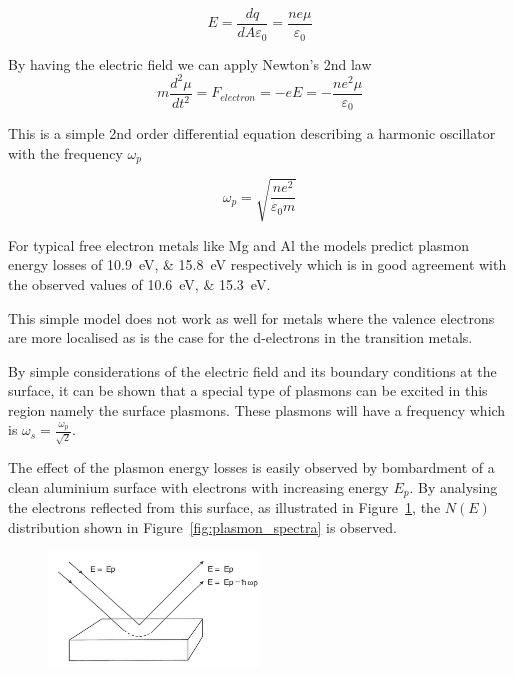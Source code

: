 \begin{equation}
E = \frac{dq}{dA\varepsilon_{0}}=\frac{ne\mu}{\varepsilon_{0}}
\end{equation}


By having the electric field we can apply Newton's 2nd law
\begin{equation}
m\frac{d^{2}\mu}{dt^2}= F_{electron}=-eE=-\frac{ne^2\mu}{\varepsilon_0}
\end{equation}

This is a simple 2nd order differential equation describing a harmonic oscillator with the frequency $\omega_{p}$

\begin{equation}
\omega_p = \sqrt{\frac{ne^2}{\varepsilon_0 m}}
\end{equation}

For typical free electron metals like Mg and Al the models predict plasmon energy losses of \SIlist{10.9;15.8}{\electronvolt} respectively which is in good agreement with the observed values of \SIlist{10.6;15.3}{\electronvolt}.

This simple model does not work as well for metals where the valence electrons are more localised as is the case for the d-electrons in the transition metals.

By simple considerations of the electric field and its boundary conditions at the surface, it can be shown that a special type of plasmons can be excited in this region namely the surface plasmons. These plasmons will have a frequency which is $\omega_{s} = \frac{\omega_{p}}{\sqrt{2}}$.

The effect of the plasmon energy losses is easily observed by bombardment of a clean aluminium surface with electrons with increasing energy $E_{p}$. By analysing the electrons reflected from this surface, as illustrated in Figure~\ref{fig:plasmon_loss}, the $N(E)$ distribution shown in Figure~\ref{fig:plasmon_spectra} is observed.
\begin{figure}[htbp]
\centering
\includegraphics[width=0.5\textwidth]{figures/02_08}
\caption{ }
\label{fig:plasmon_loss}
\end{figure}

